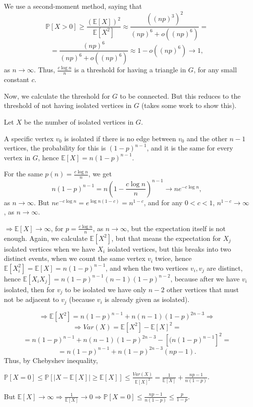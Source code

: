 \documentclass{article}
\begin{document}
We use a second-moment method, saying that \[\mathbb{P}[X>0]\geq\frac{(\mathbb{E}[X])^2}{\mathbb{E}[X^2]}\approx\frac{((np)^3)^2}{(np)^6+o((np)^6)}=\]\[=\frac{(np)^6}{(np)^6+o((np)^6)}\approx{1-o((np)^6)}\rightarrow{1},\]
as $n\rightarrow\infty$.
Thus, $\frac{c\log{n}}{n}$ is a threshold for having a triangle in $G$, for any small constant $c$.

Now, we calculate the threshold for $G$ to be connected. But this reduces to the threshold of not having isolated vertices in $G$ (takes some work to show this).

Let $X$ be the number of isolated vertices in $G$. 

A specific vertex $v_0$ is isolated if there is no edge between $v_0$ and the other $n-1$ vertices, the probability for this is $(1-p)^{n-1}$, and it is the same for every vertex in $G$, hence $\mathbb{E}[X]=n(1-p)^{n-1}$.

For the same $p(n)=\frac{c\log{n}}{n}$, we get 
\[n(1-p)^{n-1}=n(1-\frac{c\log{n}}{n})^{n-1}\rightarrow{n}e^{-c\log{n}},\]
as $n\rightarrow\infty$.
But $ne^{-c\log{n}}=e^{\log{n}(1-c)}=n^{1-c}$, and for any $0<{c}<1$, $n^{1-c}\rightarrow\infty$, as $n\rightarrow\infty$.

$\Rightarrow\mathbb{E}[X]\rightarrow\infty$, for $p=\frac{c\log{n}}{n}$, as $n\rightarrow\infty$, but the expectation itself is not enough. Again, we calculate $\mathbb{E}[X^2]$, but that means the expectation for $X_j$ isolated vertices when we have $X_i$ isolated vertices, but this breaks into two distinct events, when we count the same vertex $v_i$ twice, hence $\mathbb{E}[X_i^2]=\mathbb{E}[X]=n(1-p)^{n-1}$, and when the two vertices $v_i,v_j$ are distinct, hence $\mathbb{E}[X_iX_j]=n(1-p)^{n-1}(n-1)(1-p)^{n-2}$, because after we have $v_i$ isolated, then for $v_j$ to be isolated we have only $n-2$ other vertices that must not be adjacent to $v_j$ (because $v_i$ is already given as isolated).

\[\Rightarrow\mathbb{E}[X^2]=n(1-p)^{n-1}+n(n-1)(1-p)^{2n-3}\Rightarrow\]\[\Rightarrow{Var(X)=\mathbb{E}[X^2]-\mathbb{E}[X]^2}=\]\[=n(1-p)^{n-1}+n(n-1)(1-p)^{2n-3}-[(n(1-p)^{n-1}]^2=\]\[=n(1-p)^{n-1}+n(1-p)^{2n-3}(np-1).\]
Thus, by Chebyshev inequality,

$\mathbb{P}[X=0]\leq\mathbb{P}[|X-\mathbb{E}[X]|\geq\mathbb{E}[X]]\leq\frac{Var(X)}{\mathbb{E}[X]^2}=\frac{1}{\mathbb{E}[X]}+\frac{np-1}{n(1-p)}$. 

But $\mathbb{E}[X]\rightarrow\infty\Rightarrow\frac{1}{\mathbb{E}[X]}\rightarrow{0}\Rightarrow\mathbb{P}[X=0]\leq\frac{np-1}{n(1-p)}\leq\frac{p}{1-p}$.
\end{document}
